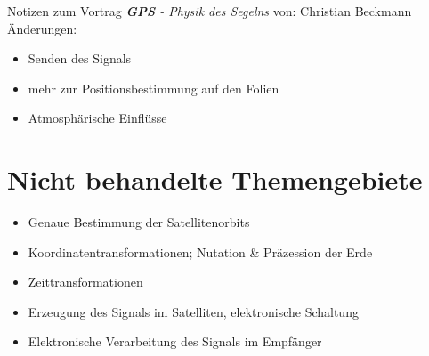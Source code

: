 
\newcommand{\ch}{$\checkmark$}

    {\huge Notizen zum Vortrag \textit{\textbf{GPS} - Physik des Segelns}}
    von: Christian Beckmann
    \tableofcontents
    Änderungen:
    \begin{itemize}
        \item Senden des Signals
        \item mehr zur Positionsbestimmung auf den Folien
        \item Atmosphärische Einflüsse
    \end{itemize}
    
    \newpage
    
    
    
    
    

    \section{Nicht behandelte Themengebiete}
    \begin{itemize}
        \item Genaue Bestimmung der Satellitenorbits
        \item Koordinatentransformationen; Nutation \& Präzession der Erde
        \item Zeittransformationen
        \item Erzeugung des Signals im Satelliten, elektronische Schaltung
        \item Elektronische Verarbeitung des Signals im Empfänger
    \end{itemize}
    \nocite{*}
    \printbibliography

